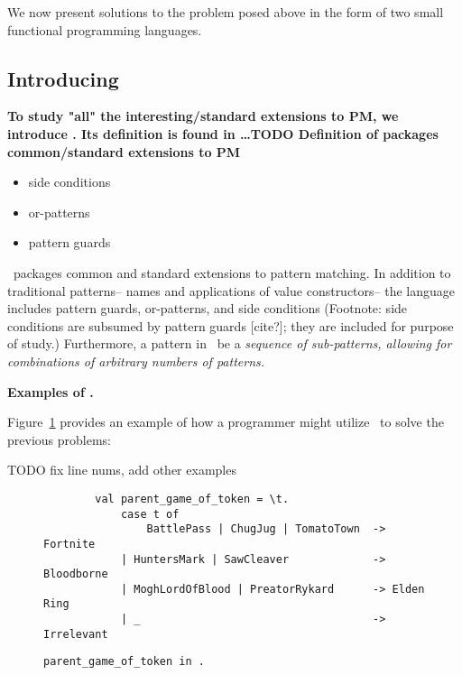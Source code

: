 \documentclass[manuscript,screen,review, 12pt]{acmart}
\begin{document}
We now present solutions to the problem posed above in the form of two small
functional programming languages. %

\subsection{Introducing \PPlus\ }

\begin{outline}[enumerate]
     \bf{To study "all" the interesting/standard extensions to PM, we introduce}
    \PPlus. Its definition is found in \dots TODO 
     \bf{Definition of \PPlus}
     \bf{{\PPlus} packages common/standard extensions to PM}
    \begin{itemize}
        \item side conditions
        \item or-patterns 
        \item pattern guards 
    \end{itemize}

    \PPlus\ packages common and standard extensions to pattern matching. In
    addition to traditional patterns-- names and applications of value
    constructors-- the language includes pattern guards, or-patterns, and side
    conditions (Footnote: side conditions are subsumed by pattern guards
    [cite?]; they are included for purpose of study.) Furthermore, a pattern in
    \PPlus\ be a \it{sequence} of sub-patterns, allowing for combinations of 
    arbitrary numbers of patterns. 
    
     \bf{Examples of \PPlus. }

    Figure~\ref{fig:ppexs} provides an example of how a programmer might utilize
    \PPlus\ to solve the previous problems: 

    TODO fix line nums, add other examples 
    \begin{figure}
        \begin{center}
            \pplst 
            \begin{lstlisting}
        val parent_game_of_token = \t. 
            case t of  
                BattlePass | ChugJug | TomatoTown  -> Fortnite
            | HuntersMark | SawCleaver             -> Bloodborne
            | MoghLordOfBlood | PreatorRykard      -> Elden Ring
            | _                                    -> Irrelevant
        \end{lstlisting}
        \end{center}    
        \caption{\tt{parent\_game\_of\_token} in \PPlus.} 
        \label{fig:ppexs}
        \end{figure}
    

\end{outline}
\end{document}
